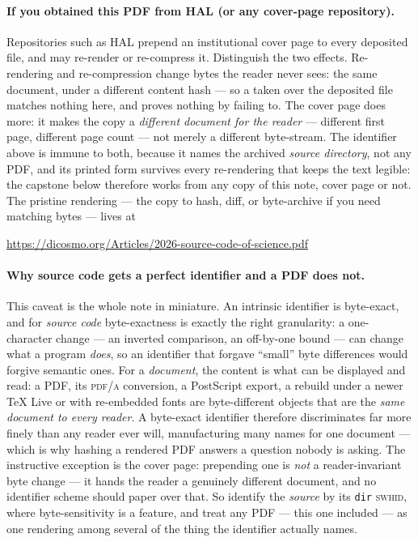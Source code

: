 \paragraph{If you obtained this PDF from HAL (or any cover-page repository).}
Repositories such as HAL prepend an institutional cover page to every deposited file, and may
re-render or re-compress it. Distinguish the two effects. Re-rendering and re-compression
change bytes the reader never sees: the same document, under a different content hash --- so a
 taken over the deposited file matches nothing here, and proves nothing by
failing to. The cover page does more: it makes the copy a \emph{different document for the
reader} --- different first page, different page count --- not merely a different byte-stream.
The identifier above is immune to both, because it names the archived \emph{source directory},
not any PDF, and its printed form survives every re-rendering that keeps the text legible: the
capstone below therefore works from any copy of this note, cover page or not. The pristine
rendering --- the copy to hash, diff, or byte-archive if you need matching bytes --- lives at
\begin{center}\url{https://dicosmo.org/Articles/2026-source-code-of-science.pdf}\end{center}

\paragraph{Why source code gets a perfect identifier and a PDF does not.}
This caveat is the whole note in miniature. An intrinsic identifier is byte-exact, and for
\emph{source code} byte-exactness is exactly the right granularity: a one-character change ---
an inverted comparison, an off-by-one bound --- can change what a program \emph{does}, so an
identifier that forgave ``small'' byte differences would forgive semantic ones. For a
\emph{document}, the content is what can be displayed and read: a PDF, its \textsc{pdf/a}
conversion, a PostScript export, a rebuild under a newer \TeX{} Live or with re-embedded fonts
are byte-different objects that are the \emph{same document to every reader}. A byte-exact
identifier therefore discriminates far more finely than any reader ever will, manufacturing
many names for one document --- which is why hashing a rendered PDF answers a question nobody
is asking. The instructive exception is the cover page: prepending one is \emph{not} a
reader-invariant byte change --- it hands the reader a genuinely different document, and no
identifier scheme should paper over that. So identify the \emph{source} by its \texttt{dir}
\textsc{swhid}, where byte-sensitivity is a feature, and treat any PDF --- this one included ---
as one rendering among several of the thing the identifier actually names.

